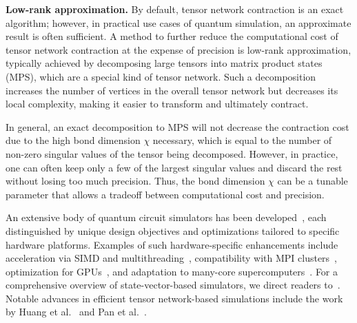 \documentclass[a4paper,onecolumn,11pt,unpublished]{quantumarticle}
\begin{document}
\textbf{Low-rank approximation.} By default, tensor network contraction is an exact algorithm; however, in practical use cases of quantum simulation, an approximate result is often sufficient. A method to further reduce the computational cost of tensor network contraction at the expense of precision is low-rank approximation, typically achieved by decomposing large tensors into matrix product states (MPS), which are a special kind of tensor network. Such a decomposition increases the number of vertices in the overall tensor network but decreases its local complexity, making it easier to transform and ultimately contract.

In general, an exact decomposition to MPS will not decrease the contraction cost due to the high bond dimension $\chi$ necessary, which is equal to the number of non-zero singular values of the tensor being decomposed. However, in practice, one can often keep only a few of the largest singular values and discard the rest without losing too much precision. Thus, the bond dimension $\chi$ can be a tunable parameter that allows a tradeoff between computational cost and precision.

An extensive body of quantum circuit simulators has been developed~\cite{JavadiAbhari2024Quantum, steigerProjectQOpenSource2018, smelyanskiyQHiPSTERQuantumHigh2016, jonesQuESTHighPerformance2019, zhangHyQuasHybridPartitioner2021, xuAtlasHierarchicalPartitioning2024b, bayraktarCuQuantumSDKHighPerformance2023, suzukiQulacsFastVersatile2021, huang2021efficient, pan2022simulation, pan2022solving}, each distinguished by unique design objectives and optimizations tailored to specific hardware platforms. Examples of such hardware-specific enhancements include acceleration via SIMD and multithreading~\cite{suzukiQulacsFastVersatile2021, smelyanskiyQHiPSTERQuantumHigh2016}, compatibility with MPI clusters~\cite{haner05PetabyteSimulation2017}, optimization for GPUs~\cite{zhangHyQuasHybridPartitioner2021, xuAtlasHierarchicalPartitioning2024b}, and adaptation to many-core supercomputers~\cite{liQuantumSupremacyCircuit2018}. For a comprehensive overview of state-vector-based simulators, we direct readers to~\cite{jamadagniBenchmarkingQuantumComputer2024}. Notable advances in efficient tensor network-based simulations include the work by Huang et al.~\cite{huang2021efficient} and Pan et al.~\cite{pan2022simulation, pan2022solving}. 
\end{document}
